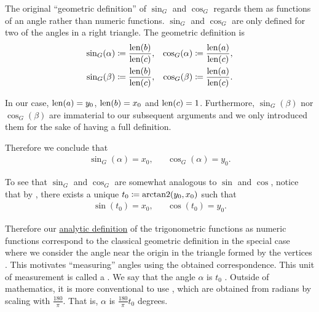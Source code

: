 \begin{definition}
  The original \enquote{geometric definition} of \( \sin_G \) and \( \cos_G \) regards them as functions of an angle rather than numeric functions. \( \sin_G \) and \( \cos_G \) are only defined for two of the angles in a right triangle. The geometric definition is
  \begin{align*}
    \sin_G(\alpha) \coloneqq \frac{\operatorname{len}(b)} {\operatorname{len}(c)}, &  & \cos_G(\alpha) \coloneqq \frac{\operatorname{len}(a)} {\operatorname{len}(c)},
    \\
    \sin_G(\beta) \coloneqq \frac{\operatorname{len}(b)} {\operatorname{len}(c)},  &  & \cos_G(\beta) \coloneqq \frac{\operatorname{len}(a)} {\operatorname{len}(c)}.
  \end{align*}

  In our case, \( \operatorname{len}(a) = y_0 \), \( \operatorname{len}(b) = x_0 \) and \( \operatorname{len}(c) = 1 \). Furthermore, \( \sin_G(\beta) \) nor \( \cos_G(
  \beta) \) are immaterial to our subsequent arguments and we only introduced them for the sake of having a full definition.

  Therefore we conclude that
  \begin{align*}
    \sin_G(\alpha) = x_0,
     &  &
    \cos_G(\alpha) = y_0.
  \end{align*}

  To see that \( \sin_G \) and \( \cos_G \) are somewhat analogous to \( \sin \) and \( \cos \), notice that by , there exists a unique \( t_0 \coloneqq \operatorname{arctan2}(y_0, x_0) \) such that
  \begin{align*}
    \sin(t_0) = x_0,
     &  &
    \cos(t_0) = y_0.
  \end{align*}

  Therefore our \hyperref[def:trigonometric_functions]{analytic definition} of the trigonometric functions as numeric functions correspond to the classical geometric definition in the special case where we consider the angle near the origin in the triangle formed by the vertices . This motivates \enquote{measuring} angles using the obtained correspondence. This unit of measurement is called a . We say that the angle \( \alpha \) is \( t_0 \) . Outside of mathematics, it is more conventional to use , which are obtained from radians by scaling with \( \tfrac {180} {\pi} \). That is, \( \alpha \) is \( \tfrac {180} {\pi} t_0 \) degrees.
\end{definition}
